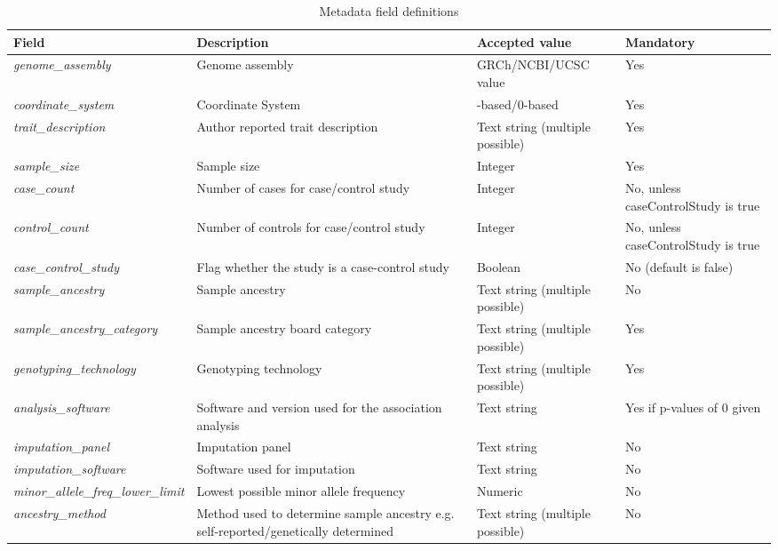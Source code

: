 \documentclass[11pt]{article}
\begin{document}
\begin{table}[h]
 \caption{Metadata field definitions}
 \centering
 \begin{tabularx}{\textwidth} { 
   | >{\hsize=1.4\hsize\centering\arraybackslash}X 
   | >{\hsize=1\hsize\centering\arraybackslash}X 
   | >{\hsize=1\hsize\centering\arraybackslash}X 
   | >{\hsize=0.6\hsize\centering\arraybackslash}X | } 
  \hline
  Field & Description & Accepted value & Mandatory \\
  \hline
  \textit{genome\_assembly} & Genome assembly & GRCh/NCBI/UCSC value & Yes\\
  \textit{coordinate\_system} & Coordinate System & 1-based/0-based & Yes\\
  \textit{trait\_description} & Author reported trait description & Text string (multiple possible) & Yes\\
  \textit{sample\_size} & Sample size & Integer & Yes\\
  \textit{case\_count} & Number of cases for case/control study & Integer & No, unless caseControlStudy is true\\
  \textit{control\_count} & Number of controls for case/control study & Integer & No, unless caseControlStudy is true\\
  \textit{case\_control\_study} & Flag whether the study is a case-control study & Boolean & No (default is false)\\
  \textit{sample\_ancestry} & Sample ancestry & Text string (multiple possible) & No\\
  \textit{sample\_ancestry\_category} & Sample ancestry board category & Text string (multiple possible) & Yes\\
  \textit{genotyping\_technology} & Genotyping technology & Text string (multiple possible) & Yes\\
  \textit{analysis\_software} & Software and version used for the association analysis & Text string & Yes if p-values of 0 given\\
  \textit{imputation\_panel} & Imputation panel & Text string & No\\
  \textit{imputation\_software} & Software used for imputation & Text string & No\\
  \textit{minor\_allele\_freq\_lower\_limit} & Lowest possible minor allele frequency & Numeric & No\\
  \textit{ancestry\_method} & Method used to determine sample ancestry e.g. self-reported/genetically determined  & Text string (multiple possible) & No\\

\end{tabularx}
\end{table}
\end{document}
